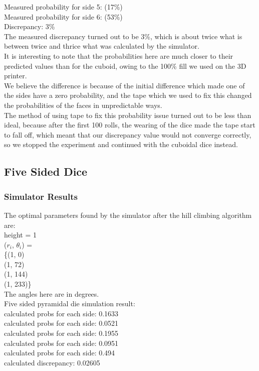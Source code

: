 Measured probability for side 5: (17\%)\\
Measured probability for side 6: (53\%)\\
Discrepancy: 3\%\\
The measured discrepancy turned out to be 3\%, which is about twice what is between twice and thrice what was calculated by the simulator.\\
It is interesting to note that the probabilities here are much closer to their predicted values than for the cuboid, owing to the 100\% fill we used on the 3D printer.\\
We believe the difference is because of the initial difference which made one of the sides have a zero probability, and the tape which we used to fix this changed the probabilities of the faces in unpredictable ways.\\
The method of using tape to fix this probability issue turned out to be less than ideal, because after the first 100 rolls, the wearing of the dice made the tape start to fall off, which meant that our discrepancy value would not converge correctly, so we stopped the experiment and continued with the cuboidal dice instead.\\

\subsection{Five Sided Dice}
\subsubsection{Simulator Results}
The optimal parameters found by the simulator after the hill climbing algorithm are:\\
height = 1\\
($r_i$, $\theta_i$) = \\
\{(1, 0)\\
(1, 72)\\
(1, 144)\\
(1, 233)\}\\
The angles here are in degrees.\\
Five sided pyramidal die simulation result:\\
calculated probs for each side: 0.1633 \\
calculated probs for each side: 0.0521 \\
calculated probs for each side: 0.1955 \\
calculated probs for each side: 0.0951 \\
calculated probs for each side: 0.494 \\
calculated discrepancy: 0.02605

